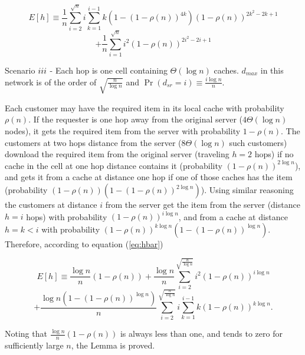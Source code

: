 \documentclass[journal]{IEEEtran}
\theoremstyle{plain}
\theoremstyle{remark}
\begin{document}
\begin{IEEEproof}
\begin{equation}
E[h]\equiv \frac{1}{n}\sum_{i=2}^{\sqrt{n}} i\sum_{k=1}^{i-1} k(1-(1-\rho(n))^{4k})(1-\rho(n))^{2k^2-2k+1} \nonumber
\end{equation}
\begin{equation}
 +  \frac{1}{n}\sum_{i=1}^{\sqrt{n}} i^2(1-\rho(n))^{2i^2-2i+1}
\end{equation}

Scenario $\romannumeral 3$ -  Each hop is one cell containing $\Theta(\log n)$ caches. $d_{max}$ in this network is of the order of $\sqrt{\frac{n}{\log n}}$ and
$\Pr(d_{sr}=i) \equiv \frac{i \log n}{n}$.


Each customer may have the required item in its local cache with probability $\rho(n)$.  If the requester is one hop away from the original server ($4\Theta(\log n)$ nodes), it gets the required item from the server with probability $1-\rho(n)$. The customers at two hops distance from the server ($8\Theta(\log n)$ such customers) download the required item from the original server (traveling $h=2$ hops) if no cache in the cell at one hop distance contains it (probability $(1-\rho(n))^{2\log n}$), and gets it from a cache at distance one hop if one of those caches has the item (probability $(1-\rho(n))(1-(1-\rho(n))^{2\log n})$). Using similar reasoning the customers at distance $i$ from the server get the item from the server (distance $h=i$ hops) with probability $(1-\rho(n))^{i\log n}$, and from a cache at distance $h=k<i$ with probability $(1-\rho(n))^{k\log n}(1-(1-\rho(n))^{\log n})$. Therefore, according to equation (\ref{eq:hbar})

\begin{equation}
		E[h]\equiv \frac{\log n}{n}(1-\rho(n))+\frac{\log n}{n}\sum_{i=2}^{\sqrt{\frac{n}{\log n}}} i^2(1-\rho(n))^{i\log n} \nonumber 
\end{equation}
\begin{equation}
		+ \frac{\log n(1-(1-\rho(n))^{\log n})}{n}\sum_{i=2}^{\sqrt{\frac{n}{\log n}}}i\sum_{k=1}^{i-1}k(1-\rho(n))^{k\log n}.
	\end{equation}

	Noting that $\frac{\log n}{n}(1-\rho(n))$ is always less than one, and tends to zero for sufficiently large $n$, the Lemma is proved.
	\end{IEEEproof}
	
\end{document}
